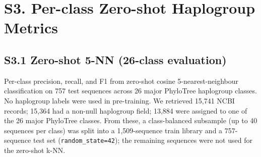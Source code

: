 \documentclass[10pt]{article}
\begin{document}
\section*{S3. Per-class Zero-shot Haplogroup Metrics}

\subsection*{S3.1 Zero-shot 5-NN (26-class evaluation)}

Per-class precision, recall, and F1 from zero-shot cosine 5-nearest-neighbour classification on
757 test sequences across 26 major PhyloTree haplogroup classes. No haplogroup labels were used
in pre-training. We retrieved 15,741 NCBI records; 15,364 had a non-null haplogroup field; 13,884
were assigned to one of the 26 major PhyloTree classes. From these, a class-balanced subsample
(up to 40 sequences per class) was split into a 1,509-sequence train library and a 757-sequence
test set (\texttt{random\_state=42}); the remaining sequences were not used for the zero-shot k-NN.
\end{document}
